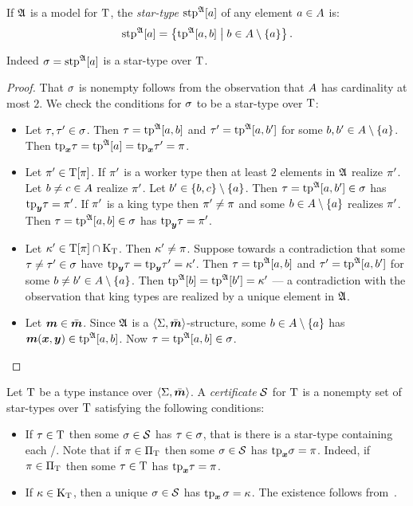 If $\mathfrak{A}$ is a model for $\mathrm{T}$, the \emph{star-type}
$\operatorname{stp}^{\mathfrak{A}}[a]$ of any element $a \in A$ is:
\[
  \operatorname{stp}^{\mathfrak{A}}[a] = \left\{\operatorname{tp}^{\mathfrak{A}}[a,b]\mathrel{}\middle|\mathrel{}b \in A \setminus \left\{a\right\}\right\}.
\]
\begin{remark}
Indeed $\sigma=\operatorname{stp}^{\mathfrak{A}}[a]$ is a star-type over $\mathrm{T}$.
\end{remark}
\begin{proof}
That $\sigma$ is nonempty follows from the observation that $A$ has
cardinality at most $2$.
We check the conditions for $\sigma$ to be a star-type over $\mathrm{T}$:
\begin{itemize}
  \item[\refcondstpx]
  Let $\tau,{\tau'}\in\sigma$.
  Then $\tau=\operatorname{tp}^{\mathfrak{A}}[a,b]$ and ${\tau'}=\operatorname{tp}^{\mathfrak{A}}[a,{b'}]$ for some
  $b,{b'}\in A\setminus\left\{a\right\}$.
  Then $\mathrm{tp}_{\bm{x}}\tau=\operatorname{tp}^{\mathfrak{A}}[a]=\mathrm{tp}_{\bm{x}}{\tau'}=\pi$.
  \item[\refcondstppy]
  Let ${\pi'}\in\mathrm{T}[\pi]$.
  If ${\pi'}$ is a worker type then at least $2$ elements in $\mathfrak{A}$ realize
  ${\pi'}$.
  Let $b\neq c\in A$ realize ${\pi'}$.
  Let ${b'}\in\left\{b,c\right\}\setminus\left\{a\right\}$.
  Then $\tau = \operatorname{tp}^{\mathfrak{A}}[a,{b'}]\in\sigma$ has $\mathrm{tp}_{\bm{y}}\tau={\pi'}$.
  If ${\pi'}$ is a king type then ${\pi'}\neq\pi$ and some
  $b\in A\setminus\left\{a\right\}$ realizes ${\pi'}$.
  Then $\tau = \operatorname{tp}^{\mathfrak{A}}[a,b]\in\sigma$ has $\mathrm{tp}_{\bm{y}}\tau={\pi'}$.
  \item[\refcondstpky]
  Let ${\kappa'}\in\mathrm{T}[\pi]\cap{\mathrm{K}}_{\mathrm{T}}$. Then ${\kappa'}\neq\pi$.
  Suppose towards a contradiction that some $\tau\neq{\tau'}\in\sigma$ have
  $\mathrm{tp}_{\bm{y}}\tau=\mathrm{tp}_{\bm{y}}{\tau'}={\kappa'}$.
  Then $\tau=\operatorname{tp}^{\mathfrak{A}}[a,b]$ and ${\tau'}=\operatorname{tp}^{\mathfrak{A}}[a,{b'}]$ for some
  $b\neq{b'}\in A\setminus\left\{a\right\}$.
  Then $\operatorname{tp}^{\mathfrak{A}}[b]=\operatorname{tp}^{\mathfrak{A}}[{b'}]={\kappa'}$ --- a contradiction with the
  observation that king types are realized by a unique element in $\mathfrak{A}$.
  \item[\refcondstpm]
  Let $\bm{m}\in\bar{\bm{m}}$. Since $\mathfrak{A}$ is a $\left\langle \mathrm{\Sigma},\bar{\bm{m}} \right\rangle$-structure, some
  $b\in A\setminus\left\{a\right\}$ has $\bm{m}(\bm{x},\bm{y}) \in \operatorname{tp}^{\mathfrak{A}}[a,b]$.
  Now $\tau = \operatorname{tp}^{\mathfrak{A}}[a,b] \in \sigma$.
\end{itemize}
\end{proof}

\begin{definition}
Let $\mathrm{T}$ be a type instance over $\left\langle \mathrm{\Sigma},\bar{\bm{m}} \right\rangle$.
A \emph{certificate} $\mathcal{S}$ for $\mathrm{T}$ is a nonempty set of star-types over
$\mathrm{T}$ satisfying the following conditions:
\begin{itemize}
  \item[\condcertT]\label{cond:certT}
  If $\tau\in\mathrm{T}$ then some $\sigma\in\mathcal{S}$ has $\tau\in\sigma$,
  that is there is a star-type containing each \twotype/.
  Note that if $\pi\in{\Pi}_{\mathrm{T}}$ then some $\sigma\in\mathcal{S}$ has $\mathrm{tp}_{\bm{x}}\sigma=\pi$.
  Indeed, if $\pi\in{\Pi}_{\mathrm{T}}$ then some $\tau\in\mathrm{T}$ has $\mathrm{tp}_{\bm{x}}\tau=\pi$.
  \item[\condcertk]\label{cond:certk}
  If $\kappa \in {\mathrm{K}}_{\mathrm{T}}$, then a unique $\sigma\in\mathcal{S}$ has $\operatorname{tp}_{\bm{x}}\sigma = \kappa$.
  The existence follows from~.
\end{itemize}
\end{definition}

